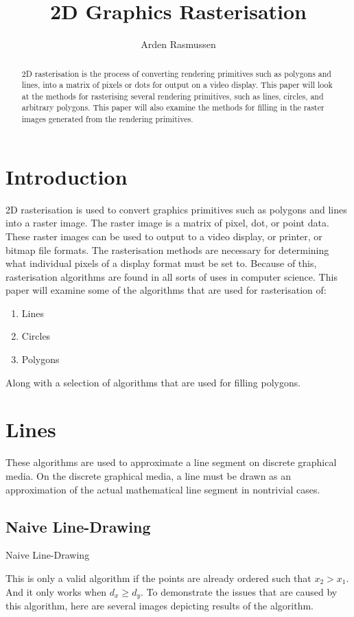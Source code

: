 \documentclass[10pt]{article}
\title{2D Graphics Rasterisation}
\author{Arden Rasmussen}
\begin{document}
\maketitle
{}
\begin{abstract}
   2D rasterisation is the process of converting rendering primitives such as
   polygons and lines, into a matrix of pixels or dots for output on a video
   display. This paper will look at the methods for rasterising several
   rendering primitives, such as lines, circles, and arbitrary polygons. This
   paper will also examine the methods for filling in the raster images
   generated from the rendering primitives.
\end{abstract}
\section{Introduction}\label{sec:introduction}
   2D rasterisation is used to convert graphics primitives such as polygons and
   lines into a raster image. The raster image is a matrix of pixel, dot, or
   point data. These raster images can be used to output to a video display, or
   printer, or bitmap file formats. The rasterisation methods are necessary for
   determining what individual pixels of a display format must be set to.
   Because of this, rasterisation algorithms are found in all sorts of uses in
   computer science. This paper will examine some of the algorithms that are
   used for rasterisation of:
   \begin{enumerate}
     \item Lines
     \item Circles
     \item Polygons
   \end{enumerate}
   Along with a selection of algorithms that are used for filling polygons.

\section{Lines}\label{sec:lines}
  These algorithms are used to approximate a line segment on discrete graphical
  media. On the discrete graphical media, a line must be drawn as an
  approximation of the actual mathematical line segment in nontrivial cases.
  \subsection{Naive Line-Drawing}\label{sub:naive_line_drawing}
  \begin{algorithm}[H]
    \caption{Naive Line-Drawing}
    \begin{algorithmic}
      \EndFor{}
    \end{algorithmic}
  \end{algorithm}
  This is only a valid algorithm if the points are already ordered such that
  $x_2 > x_1$. And it only works when $d_x \geq d_y$. To demonstrate the issues
  that are caused by this algorithm, here are several images depicting results
  of the algorithm.
\end{document}
